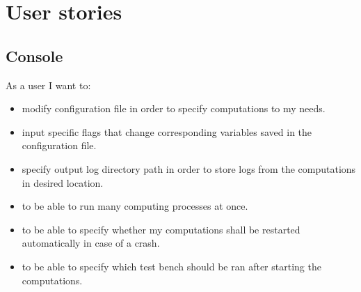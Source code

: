 \documentclass{article}
\begin{document}

\newpage
\section{User stories}


%
%
\subsection{Console}
As a user I want to:
\begin{itemize}
	\item 
		modify configuration file in order to specify computations to my needs.

	\item 
		input specific flags that change corresponding variables saved in the configuration file.
		
	\item 
		specify output log directory path in order to store logs from the computations in desired location.
		
	\item 
		to be able to run many computing processes at once.
	
	\item
		to be able to specify whether my computations shall be restarted automatically in case of a crash.

	\item
		to be able to specify which test bench should be ran after starting the computations.
				

		
\end{itemize}


%
%
\end{document}
